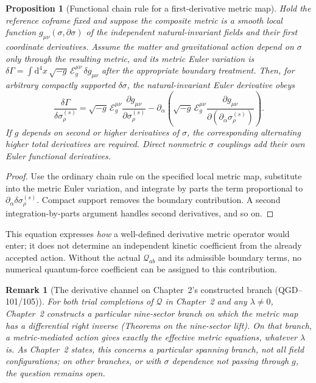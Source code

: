 \documentclass[11pt,a4paper]{article}
\newtheorem{proposition}[theorem]{Proposition}
\newtheorem{remark}[theorem]{Remark}
\newcommand{\dd}{\mathrm d}
\begin{document}
\begin{proposition}[Functional chain rule for a first-derivative metric map]
\label{prop:jet}
Hold the reference coframe fixed and suppose the composite metric is a
smooth local function $g_{\mu\nu}(\sigma,\partial\sigma)$ of the
independent natural-invariant fields and their first coordinate
derivatives. Assume the matter and gravitational action depend on
$\sigma$ only through the resulting metric, and its metric Euler
variation is
$\delta\Gamma=\int\dd^4x\,\sqrt{-g}\,\mathcal E_g^{\mu\nu}\,
\delta g_{\mu\nu}$ after the appropriate boundary treatment.
Then, for arbitrary compactly supported $\delta\sigma$, the
natural-invariant Euler derivative obeys
\begin{equation}\label{eq:jet}
\boxed{\displaystyle
\frac{\delta\Gamma}{\delta\sigma^{(s)}_\rho}
=\sqrt{-g}\,\mathcal E_g^{\mu\nu}
\frac{\partial g_{\mu\nu}}{\partial\sigma^{(s)}_\rho}
-\partial_\alpha\!\left(
\sqrt{-g}\,\mathcal E_g^{\mu\nu}
\frac{\partial g_{\mu\nu}}
{\partial(\partial_\alpha\sigma^{(s)}_\rho)}\right).}
\end{equation}
If $g$ depends on second or higher derivatives of $\sigma$, the
corresponding alternating higher total derivatives are required.
Direct nonmetric $\sigma$ couplings add their \emph{own} Euler
functional derivatives.
\end{proposition}
\begin{proof}
Use the ordinary chain rule on the specified local metric map,
substitute into the metric Euler variation, and integrate by parts
the term proportional to
$\partial_\alpha\delta\sigma^{(s)}_\rho$. Compact support removes
the boundary contribution. A second integration-by-parts argument
handles second derivatives, and so on.
\end{proof}
This equation expresses \emph{how} a well-defined derivative metric
operator would enter; it does not determine an independent kinetic
coefficient from the already accepted action. Without the actual
$\mathcal Q_{ab}$ and its admissible boundary terms, no numerical
quantum-force coefficient can be assigned to this contribution.

\begin{remark}[The derivative channel on Chapter~2's constructed branch (QGD--101/105)]
\label{rem:Q-absorbed}
For both trial completions of $\mathcal Q$ in Chapter~2 and any $\lambda\neq0$,
Chapter~2 constructs a particular nine-sector branch on which the metric map has
a differential right inverse (Theorems on the nine-sector lift). On that branch,
a metric-mediated action gives exactly the effective metric equations, whatever
$\lambda$ is. As Chapter~2 states, this concerns a particular spanning branch,
not all field configurations; on other branches, or with $\sigma$ dependence not
passing through $g$, the question remains open.
\end{remark}
\end{document}

